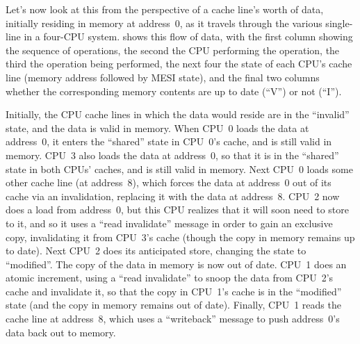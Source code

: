 Let's now look at this from the perspective of a cache line's worth
of data, initially residing in memory at address~0,
as it travels through the various single-line 
in a four-CPU system.
shows this flow of data, with the first column showing the sequence
of operations, the second the CPU performing the operation,
the third the operation being performed, the next four the state
of each CPU's cache line (memory address followed by MESI state),
and the final two columns whether the corresponding memory contents
are up to date (``V'') or not (``I'').

Initially, the CPU cache lines in which the data would reside are
in the ``invalid'' state, and the data is valid in memory.
When CPU~0 loads the data at address~0, it enters the ``shared'' state in
CPU~0's cache, and is still valid in memory.
CPU~3 also loads the data at address~0, so that it is in the
``shared'' state in both CPUs' caches, and is still valid in memory.
Next CPU~0 loads some other cache line (at address~8),
which forces the data at address~0 out of its cache via an invalidation,
replacing it with the data at address~8.
CPU~2 now does a load from address~0, but this CPU realizes that it will
soon need to store to it, and so it uses a ``read invalidate'' message
in order to gain an exclusive copy, invalidating
it from CPU~3's cache (though the copy in memory remains up to date).
Next CPU~2 does its anticipated store, changing the state to ``modified''.
The copy of the data in memory is now out of date.
CPU~1 does an atomic increment, using a ``read invalidate'' to snoop
the data from CPU~2's cache
and invalidate it, so that the copy in CPU~1's cache is in the ``modified''
state (and the copy in memory remains out of date).
Finally, CPU~1 reads the cache line at address~8, which uses a
``writeback'' message to push address~0's data back out to memory.

